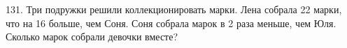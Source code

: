 131. Три подружки решили коллекционировать марки. Лена собрала 22 марки, что на 16 больше, чем Соня. Соня собрала марок в 2 раза меньше, чем Юля. Сколько марок собрали девочки вместе?\\
